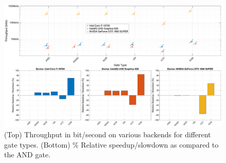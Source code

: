 \begin{figure}[hb]
    \centering
    \includegraphics[height=0.8\textheight]{execution_model/slides_throughput_by_gate_type.eps}
    \caption{(Top) Throughput in bit/second on various backends for different gate types. (Bottom) \% Relative speedup/slowdown as compared to the AND gate.}
    \label{fig:gate_throughput}
\end{figure}